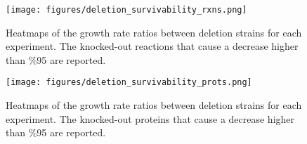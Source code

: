 \begin{figure}[H]
  \begin{center}
  \texttt{[image: figures/deletion\_survivability\_rxns.png]}
  \caption[Heatmaps of the growth rate ratios between deletion strains for each experiment. The knocked-out reactions that cause a decrease higher than \%95 are reported.]{Heatmaps of the growth rate ratios between deletion strains for each experiment. The knocked-out reactions that cause a decrease higher than \%95 are reported.}
  \label{fig:deletion_survivability_rxns}
  \end{center}
\end{figure}

\vspace{-1cm}

\begin{figure}[H]
  \begin{center}
  \texttt{[image: figures/deletion\_survivability\_prots.png]}
  \caption[Heatmaps of the growth rate ratios between deletion strains for each experiment. The knocked-out proteins that cause a decrease higher than \%95 are reported.]{Heatmaps of the growth rate ratios between deletion strains for each experiment. The knocked-out proteins that cause a decrease higher than \%95 are reported.}
  \label{fig:deletion_survivability_prots}
  \end{center}
\end{figure}

\vspace{-1cm}

